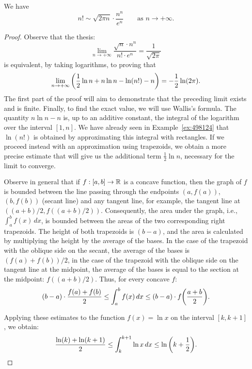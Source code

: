 \begin{theorem}
\label{th:stirling}%
\mymark{*}%
%
%
%
%
We have
\[
  n! \sim \sqrt{2\pi n}\cdot \frac{n^n}{e^n}
  \qquad \text{as $n\to +\infty$.}
\]
\end{theorem}
%
\begin{proof}
Observe that the thesis:
\[
  \lim_{n\to +\infty}\frac{\sqrt{n} \cdot n^n}{n!\cdot e^n } = \frac{1}{\sqrt{2\pi}}
\]
is equivalent, by taking logarithms, to proving that
\[
   \lim_{n\to +\infty} {\left( \frac 1 2 \ln n + n \ln n - \ln(n!) - n \right)}
   = -\frac 1 2 \ln (2\pi).
\]
The first part of the proof will aim to demonstrate that the preceding limit
exists and is finite. Finally, to find the exact value, we will use Wallis's
formula.
The quantity $n\ln n - n$ is, up to an additive constant, the integral of the
logarithm over the interval $[1,n]$.
We have already seen in Example~\ref{ex:498124} that $\ln(n!)$ is obtained by
approximating this integral with rectangles.
If we proceed instead with an approximation using trapezoids, we obtain a more
precise estimate that will give us the additional term $\frac 1 2 \ln n$,
necessary for the limit to converge.

Observe in general that if $f:[a,b]\to {\mathbb R}$ is a concave function, then the
graph of $f$ is bounded between the line passing through the endpoints
$(a,f(a))$, $(b,f(b))$ (secant line) and any tangent line, for example, the
tangent line at $((a+b)/2,f((a+b)/2))$.
Consequently, the area under the graph, i.e., $\int_a^b f(x)\, dx$, is bounded
between the areas of the two corresponding right trapezoids. The height of both
trapezoids is $(b-a)$, and the area is calculated by multiplying the height by
the average of the bases. In the case of the trapezoid with the oblique side on
the secant, the average of the bases is $(f(a)+f(b))/2$, in the case of the
trapezoid with the oblique side on the tangent line at the midpoint, the average
of the bases is equal to the section at the midpoint: $f((a+b)/2)$. Thus, for
every concave $f$:
\[
   (b-a)\cdot  \frac{f(a) + f(b)}{2}
   \le \int_a^b f(x) \, dx
   \le (b-a) \cdot f{\left( \frac{a+b}{2} \right)}.
\]

Applying these estimates to the function $f(x) = \ln x$ on the interval $[k,
k+1]$, we obtain:
\[
\frac{\ln(k) + \ln(k+1)}{2}
\le \int_k^{k+1} \ln x\, dx
\le \ln {\left( k+\frac 1 2 \right)}.
\]


\end{proof}
